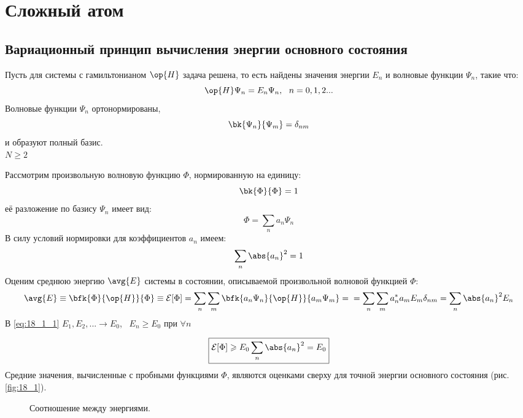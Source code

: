 \chapter{Сложный атом}

\section{Вариационный принцип вычисления энергии основного состояния}

Пусть для системы с гамильтонианом $\op{H}$ задача решена, то есть найдены значения энергии $E_n$ и волновые функции $\Psi_n$, такие что:
$$
\op{H}\Psi_n = E_n \Psi_n,~~ n = 0,1,2...
$$
Волновые функции $\Psi_n$ ортонормированы,
$$
\bk{\Psi_n}{\Psi_m} = \delta_{nm}
$$
и образуют полный базис.\\
$N \geqslant 2$

Рассмотрим произвольную волновую функцию $\Phi$, нормированную на единицу:
$$
\bk{\Phi}{\Phi} = 1
$$
её разложение по базису $\Psi_n$ имеет вид:
$$
\Phi = \sum_n a_n \Psi_n
$$
В силу условий нормировки для коэффициентов $a_n$ имеем:
$$
\sum_n \abs{a_n}^2 = 1
$$
Оценим среднюю энергию $\avg{E}$ системы в состоянии, описываемой произвольной волновой функцией $\Phi$:
\begin{equation}
\label{eq:18_1_1}
\avg{E} \equiv \bfk{\Phi}{\op{H}}{\Phi} \equiv \mathcal{E}[\Phi] = \sum_n \sum_m \bfk{a_n \Psi_n}{\op{H}}{a_m \Psi_m} = \\ = \sum_n \sum_m a_n^* a_m E_m \delta_{nm} = \sum_n \abs{a_n}^2 E_n
\end{equation}
В \eqref{eq:18_1_1} $E_1, E_2, ... \to E_0$,~ $E_n \geqslant E_0$ при $\forall n$

\begin{equation}
\label{eq:18_1_2}
\boxed{\mathcal{E}[\Phi] \geqslant E_0 \sum_n \abs{a_n}^2 = E_0}
\end{equation}
Средние значения, вычисленные с пробными функциями $\Phi$, являются оценками сверху для точной энергии основного состояния (рис. \eqref{fig:18_1}).

\begin{figure}[h!]
\centering
{}
\caption{Соотношение между энергиями.} \label{fig:18_1}
\end{figure}


